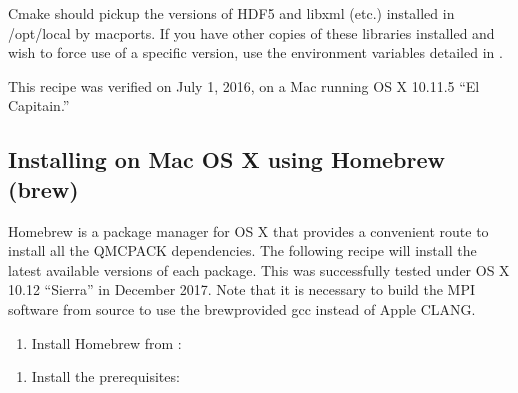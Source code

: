 \documentclass[letterpaper,10pt,english]{sphinxmanual}
\begin{document}
Cmake should pickup the versions of HDF5 and libxml (etc.) installed in
/opt/local by macports. If you have other copies of these libraries
installed and wish to force use of a specific version, use the
environment variables detailed in {\hyperref[\detokenize{installation:envvar}]{}}.

This recipe was verified on July 1, 2016, on a Mac running OS X 10.11.5
“El Capitain.”


\subsection{Installing on Mac OS X using Homebrew (brew)}
\label{\detokenize{installation:installing-on-mac-os-x-using-homebrew-brew}}
Homebrew is a package manager for OS X that provides a convenient
route to install all the QMCPACK dependencies. The
following recipe will install the latest available versions of each
package. This was successfully tested under OS X 10.12 “Sierra” in December 2017. Note that it is necessary to build the MPI software from
source to use the brew\sphinxhyphen{}provided gcc instead of Apple CLANG.
\begin{enumerate}
%
\item {} 
Install Homebrew from :

\end{enumerate}
\begin{quote}

\begin{sphinxVerbatim}[commandchars=\\\{\}]
  
\end{sphinxVerbatim}
\end{quote}
\begin{enumerate}
%
\setcounter{enumi}{1}
\item {} 
Install the prerequisites:

\end{enumerate}
\end{document}
